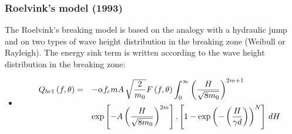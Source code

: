 \subsubsection{Roelvink's model (1993)}
\label{parag4.3.5.3}
 The Roelvink's breaking model \cite{Roelvink1993} is based on the analogy with a hydraulic jump and on two types of wave height distribution in the breaking zone (Weibull or Rayleigh). The energy sink term is written according to the wave height distribution in the breaking zone:

\begin{itemize}
\item  {}
\begin{equation} \label{GrindEQ__4_50_}
\barr{ll}
\dsp Q_{br1} \left(f,\theta \right)=&\dsp -\alpha f_{c} mA\,  \sqrt{\frac{2}{m_{0} } }F\left(f,\theta \right)\int _{0}^{\infty }\left(\frac{H}{\sqrt{8m_{0} } } \right)^{2m+1} \\[12pt]
\dsp &\dsp \exp \left[-A\left(\frac{H}{\sqrt{8m_{0} } } \right)^{2m} \right].\left[1-\exp \left(-\left(\frac{H}{\gamma d} \right)\right)^{N} \right] \, dH
\earr
\end{equation}
\end{itemize}

